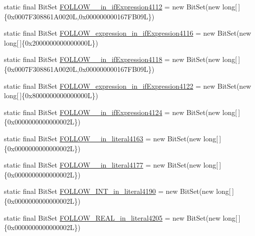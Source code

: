 \begin{DoxyCompactItemize}
\item 
static final Bit\-Set \hyperlink{classorg_1_1tzi_1_1use_1_1parser_1_1soil_1_1_soil_parser_a3fc15a350b8ae37f00f046671ea67f03}{F\-O\-L\-L\-O\-W\-\_\-\_\-in\-\_\-if\-Expression4112} = new Bit\-Set(new long\mbox{[}$\,$\mbox{]}\{0x0007\-F308861\-A0020\-L,0x000000000167\-F\-B09\-L\})
\item 
static final Bit\-Set \hyperlink{classorg_1_1tzi_1_1use_1_1parser_1_1soil_1_1_soil_parser_a51459945b85fe891d2e3e8245210dad9}{F\-O\-L\-L\-O\-W\-\_\-expression\-\_\-in\-\_\-if\-Expression4116} = new Bit\-Set(new long\mbox{[}$\,$\mbox{]}\{0x2000000000000000\-L\})
\item 
static final Bit\-Set \hyperlink{classorg_1_1tzi_1_1use_1_1parser_1_1soil_1_1_soil_parser_a027d54920b0fc5d96bd90721deed721e}{F\-O\-L\-L\-O\-W\-\_\-\_\-in\-\_\-if\-Expression4118} = new Bit\-Set(new long\mbox{[}$\,$\mbox{]}\{0x0007\-F308861\-A0020\-L,0x000000000167\-F\-B09\-L\})
\item 
static final Bit\-Set \hyperlink{classorg_1_1tzi_1_1use_1_1parser_1_1soil_1_1_soil_parser_a72193e0b24ccf56c4a74c8d394530a38}{F\-O\-L\-L\-O\-W\-\_\-expression\-\_\-in\-\_\-if\-Expression4122} = new Bit\-Set(new long\mbox{[}$\,$\mbox{]}\{0x8000000000000000\-L\})
\item 
static final Bit\-Set \hyperlink{classorg_1_1tzi_1_1use_1_1parser_1_1soil_1_1_soil_parser_af9a4f2fb7dc0b5b568815699d6c18e4b}{F\-O\-L\-L\-O\-W\-\_\-\_\-in\-\_\-if\-Expression4124} = new Bit\-Set(new long\mbox{[}$\,$\mbox{]}\{0x0000000000000002\-L\})
\item 
static final Bit\-Set \hyperlink{classorg_1_1tzi_1_1use_1_1parser_1_1soil_1_1_soil_parser_a0ebf23beb01b1d0afb67b94e391a10eb}{F\-O\-L\-L\-O\-W\-\_\-\_\-in\-\_\-literal4163} = new Bit\-Set(new long\mbox{[}$\,$\mbox{]}\{0x0000000000000002\-L\})
\item 
static final Bit\-Set \hyperlink{classorg_1_1tzi_1_1use_1_1parser_1_1soil_1_1_soil_parser_ae97084effb4783a316ccbb78eb65db0e}{F\-O\-L\-L\-O\-W\-\_\-\_\-in\-\_\-literal4177} = new Bit\-Set(new long\mbox{[}$\,$\mbox{]}\{0x0000000000000002\-L\})
\item 
static final Bit\-Set \hyperlink{classorg_1_1tzi_1_1use_1_1parser_1_1soil_1_1_soil_parser_a2efa2e9678096fe4db362b11f89bd137}{F\-O\-L\-L\-O\-W\-\_\-\-I\-N\-T\-\_\-in\-\_\-literal4190} = new Bit\-Set(new long\mbox{[}$\,$\mbox{]}\{0x0000000000000002\-L\})
\item 
static final Bit\-Set \hyperlink{classorg_1_1tzi_1_1use_1_1parser_1_1soil_1_1_soil_parser_a48ddc67fb61cbd2afe2d6657da2d8ae9}{F\-O\-L\-L\-O\-W\-\_\-\-R\-E\-A\-L\-\_\-in\-\_\-literal4205} = new Bit\-Set(new long\mbox{[}$\,$\mbox{]}\{0x0000000000000002\-L\})

\end{DoxyCompactItemize}
